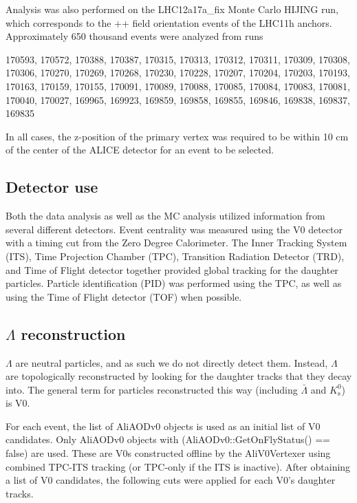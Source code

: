 Analysis was also performed on the LHC12a17a\_fix Monte Carlo HIJING run, which corresponds to the ++ field orientation events of the LHC11h anchors.  Approximately 650 thousand events were analyzed from runs

170593, 170572, 170388, 170387, 170315, 170313, 170312, 170311, 170309, 170308, 170306, 170270, 170269, 170268, 170230, 170228, 170207, 170204, 170203, 170193, 170163, 170159, 170155, 170091, 170089, 170088, 170085, 170084, 170083, 170081, 170040, 170027, 169965, 169923, 169859, 169858, 169855, 169846, 169838, 169837, 169835

In all cases, the z-position of the primary vertex was required to be within 10 cm of the center of the ALICE detector for an event to be selected.  

\subsection{Detector use}
Both the data analysis as well as the MC analysis utilized information from several different detectors.  Event centrality was measured using the V0 detector with a timing cut from the Zero Degree Calorimeter.  The Inner Tracking System (ITS), Time Projection Chamber (TPC), Transition Radiation Detector (TRD), and Time of Flight detector together provided global tracking for the daughter particles.  Particle identification (PID) was performed using the TPC, as well as using the Time of Flight detector (TOF) when possible.

\subsection{$\Lambda$ reconstruction}
\label{sec:Recon}

$\Lambda$ are neutral particles, and as such we do not directly detect them.  Instead, $\Lambda$ are topologically reconstructed by looking for the daughter tracks that they decay into.  The general term for particles reconstructed this way (including $\bar{\Lambda}$ and $K^0_\mathrm{s}$) is V0.

For each event, the list of AliAODv0 objects is used as an initial list of V0 candidates.  Only AliAODv0 objects with (AliAODv0::GetOnFlyStatus() == false) are used.  These are V0s constructed offline by the AliV0Vertexer using combined TPC-ITS tracking (or TPC-only if the ITS is inactive).  After obtaining a list of V0 candidates, the following cuts were applied for each V0's daughter tracks.

